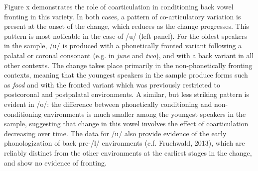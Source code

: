 \documentclass[12pt]{article}
\begin{document}
Figure x demonstrates the role of coarticulation in conditioning back vowel fronting in this variety. In both cases, a pattern of co-articulatory variation is present at the onset of the change, which reduces as the change progresses. This pattern is most noticable in the case of /u/ (left panel). For the oldest speakers in the sample, /u/ is produced with a phonetically fronted variant following a palatal or coronal consonant (e.g. in \textit{june} and \textit{two}), and with a back variant in all other contexts. The change takes place primarily in the non-phonetically fronting contexts, meaning that the youngest speakers in the sample produce forms such as \textit{food} and  with the fronted variant which was previously restricted to postcoronal and postpalatal environments. A similar, but less striking pattern is evident in /o/: the difference between phonetically conditioning and non-conditioning environments is much smaller among the youngest speakers in the sample, suggesting that change in this vowel involves the effect of coarticulation decreasing over time. The data for /u/ also provide evidence of the early phonologization of back pre-/l/ environments (c.f. Fruehwald, 2013), which are reliably distinct from the other environments at the earliest stages in the change, and show no evidence of fronting.
\end{document}
